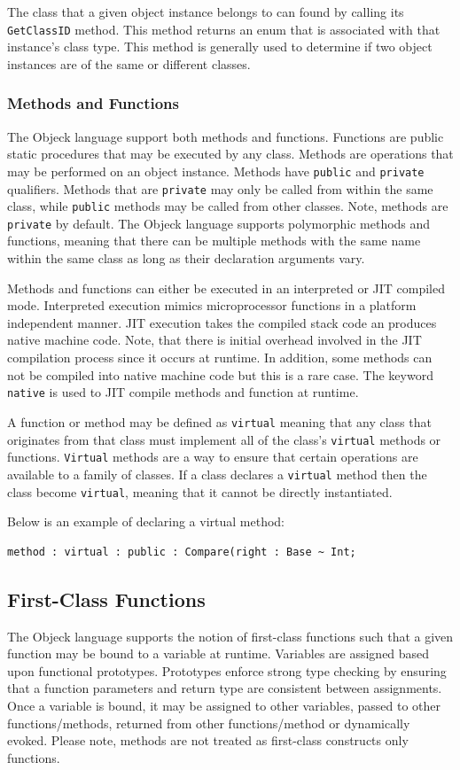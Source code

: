 \documentclass[12pt]{article}
\begin{document}
The class that a given object instance belongs to can found by calling its \texttt{GetClassID} method.  This method returns an enum that is associated with that instance's class type.  This method is generally used to determine if two object instances are of the same or different classes.

\subsubsection{Methods and Functions}
The Objeck language support both methods and functions.  Functions are public static procedures that may be executed by any class.  Methods are operations that may be performed on an object instance.  Methods have \texttt{public} and \texttt{private} qualifiers.  Methods that are \texttt{private} may only be called from within the same class, while \texttt{public} methods may be called from other classes.  Note, methods are \texttt{private} by default. The Objeck language supports polymorphic methods and functions, meaning that there can be multiple methods with the same name within the same class as long as their declaration arguments vary.

Methods and functions can either be executed in an interpreted or JIT compiled mode. Interpreted execution mimics microprocessor functions in a platform independent manner. JIT execution takes the compiled stack code an produces native machine code. Note, that there is initial overhead involved in the JIT compilation process since it occurs at runtime. In addition, some methods can not be compiled into native machine code but this is a rare case.  The keyword \texttt{native} is used to JIT compile methods and function at runtime.

A function or method may be defined as \texttt{virtual} meaning that any class that originates from that class must implement all of the class's \texttt{virtual} methods or functions.  \texttt{Virtual} methods are a way to ensure that certain operations are available to a family of classes. If a class declares a \texttt{virtual} method then the class become \texttt{virtual}, meaning that it cannot be directly instantiated.

Below is an example of declaring a virtual method:
\begin{verbatim}
method : virtual : public : Compare(right : Base ~ Int;
\end{verbatim}

\subsection{First-Class Functions}
The Objeck language supports the notion of first-class functions such that a given function may be bound to a variable at runtime.  Variables are assigned based upon functional prototypes.  Prototypes enforce strong type checking by ensuring that a function parameters and return type are consistent between assignments.  Once a variable is bound, it may be assigned to other variables, passed to other functions/methods, returned from other functions/method or dynamically evoked.  Please note, methods are not treated as first-class constructs only functions.  
\end{document}
